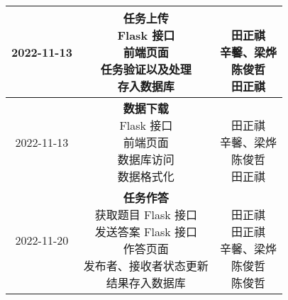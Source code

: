\begin{table}[h!]
\begin{tabular}{ccc}
        2022-11-13 & \makecell[l]{\textbf{任务上传} \\
            Flask 接口 \\
            前端页面 \\
            任务验证以及处理 \\
            存入数据库 \\
        } & \makecell{ \\
            田正祺 \\
            辛馨、梁烨 \\
            陈俊哲 \\
            田正祺 \\
        } \\\midrule
        2022-11-13 & \makecell[l]{\textbf{数据下载} \\
            Flask 接口 \\
            前端页面 \\
            数据库访问 \\
            数据格式化 \\
        } & \makecell{ \\
            田正祺 \\
            辛馨、梁烨 \\
            陈俊哲 \\
            田正祺 \\
        } \\\midrule
        2022-11-20 & \makecell[l]{\textbf{任务作答} \\
            获取题目 Flask 接口 \\
            发送答案 Flask 接口 \\
            作答页面 \\
            发布者、接收者状态更新 \\
            结果存入数据库 \\
        } & \makecell{ \\
            田正祺 \\
            田正祺 \\
            辛馨、梁烨 \\
            陈俊哲 \\
            陈俊哲 \\
        } \\
        \bottomrule
    \end{tabular}
\end{table}

\newpage

